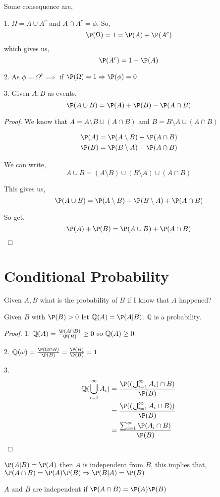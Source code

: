  Some consequence are,

 1. $\Omega = A \cup A^{c}$  and $A \cap A^{c} = \phi$. So, 
 $$ \P(\Omega) = 1 = \P(A)   + \P(A^{c}) $$  which gives us, 
 $$ \P(A^{c}) = 1 - \P(A) $$ 


 2. As $\phi = \Omega^{c} \implies $ if $\P(\Omega) = 1 \implies \P(\phi) = 0$


 3. Given  $A, B$ as events,  
 $$ \P(A \cup B) = \P(A) + \P(B) - \P(A \cap B) $$ 

 \begin{proof}
     We know that $A = A \setminus B \cup (A \cap B)$ and  $B = B \setminus A \cup (A \cap B)$

     
     \begin{align*}
         \P(A) &= \P(A \setminus B) + \P(A \cap B)\\
         \P(B) &= \P(B \setminus A) + \P(A \cap B)\\
     \end{align*}

     We can write,
     $$ A\cup B = (A \setminus B) \cup (B \setminus A) \cup ( A \cap B)  $$ 

     This gives us, 
     $$ \P(A \cup B)= \P(A \setminus B) + \P(B \setminus A) + \P(A \cap B) $$ 

     So get, 
     $$ \P(A) + \P(B) = \P(A \cup B) + \P(A \cap B) $$ 
 \end{proof}




\section{Conditional Probability}
Given $A, B$ what is the probability of $B$ if I know that  $A$ happened?
\begin{theorem}
    Given $B$ with $\P(B) > 0$ let $\mathbb{Q}(A) = \P(A | B)$. $\mathbb{Q}$ is a probability.
\end{theorem}
\begin{proof}

    1. $\Q(A) = \frac{\P(A \cap B)}{\P(B)} \ge 0$ so $\mathbb{Q}(A) \ge 0$

    2. $\Q(\omega) = \frac{\P(\Omega \cap B)}{\P(B)} = \frac{\P(B)}{\P(B)} = 1$ 

    3.
    \begin{align*}
        \Q(\bigcup_{i = 1}^{\infty} A_i) &= \frac{\P((\bigcup_{i = 1}^{\infty} A_i) \cap B)}{\P(B)}\\
                             &= \frac{\P((\bigcup_{i = 1}^{\infty} A_i \cap B) )}{\P(B)}\\
                             &= \frac{\sum_{i=1}^{\infty} \P(A_i \cap B)}{\P(B)}
    \end{align*}



    
\end{proof}

$\P(A | B) = \P(A)$ then  $A$ is independent from  $B$, this implies that, $\P(A \cap B) = \P(A) \P(B)  \implies \P(B | A) = \P(B)$
\begin{definition}
    $A$ and $B$ are independent if $\P(A \cap B) = \P(A) \P(B)$
\end{definition}



